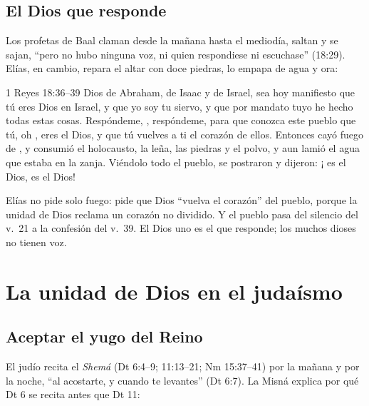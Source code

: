 \subsection{El Dios que responde}
Los profetas de Baal claman desde la mañana hasta el mediodía, saltan y se sajan, ``pero no hubo ninguna voz, ni quien respondiese ni escuchase'' (18:29). Elías, en cambio, repara el altar con doce piedras, lo empapa de agua y ora:

\begin{verso}{1 Reyes 18:36–39}
\SENOR{} Dios de Abraham, de Isaac y de Israel, sea hoy manifiesto que tú eres Dios en Israel, y que yo soy tu siervo, y que por mandato tuyo he hecho todas estas cosas. Respóndeme, \SENOR, respóndeme, para que conozca este pueblo que tú, oh \SENOR, eres el Dios, y que tú vuelves a ti el corazón de ellos. Entonces cayó fuego de \SENOR, y consumió el holocausto, la leña, las piedras y el polvo, y aun lamió el agua que estaba en la zanja. Viéndolo todo el pueblo, se postraron y dijeron: ¡\SENOR{} es el Dios, \SENOR{} es el Dios!
\end{verso}

Elías no pide solo fuego: pide que Dios ``vuelva el corazón'' del pueblo, porque la unidad de Dios reclama un corazón no dividido. Y el pueblo pasa del silencio del v.~21 a la confesión del v.~39. El Dios uno es el que responde; los muchos dioses no tienen voz.


\section{La unidad de Dios en el judaísmo}\label{sec:judaismo-uno}

\subsection{Aceptar el yugo del Reino}
El judío recita el \emph{Shemá} (Dt 6:4--9; 11:13--21; Nm 15:37--41) por la mañana y por la noche, ``al acostarte, y cuando te levantes'' (Dt 6:7). La Misná explica por qué Dt 6 se recita antes que Dt 11:

